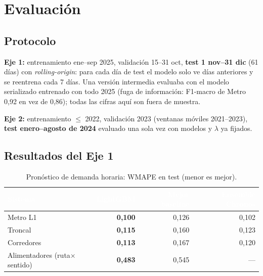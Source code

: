 \documentclass[11pt]{article}
\begin{document}
\section{Evaluación}

\subsection{Protocolo}

\textbf{Eje 1:} entrenamiento ene--sep 2025, validación 15--31 oct, \textbf{test 1 nov--31 dic}
(61 días) con \emph{rolling-origin}: para cada día de test el modelo solo ve días anteriores y se
reentrena cada 7 días. Una versión intermedia evaluaba con el modelo serializado entrenado con todo
2025 (fuga de información: F1-macro de Metro 0,92 en vez de 0,86); todas las cifras aquí son fuera de
muestra.

\textbf{Eje 2:} entrenamiento $\le$ 2022, validación 2023 (ventanas móviles 2021--2023), \textbf{test
enero--agosto de 2024} evaluado una sola vez con modelos y $\lambda$ ya fijados.

\subsection{Resultados del Eje 1}

\begin{table}[H]
\centering\small
\begin{tabular}{@{}lrrr@{}}
\toprule
\rowcolor{tablehead} \textcolor{white}{\bfseries Sistema} & \textcolor{white}{\bfseries LightGBM} & \textcolor{white}{\bfseries Mejor baseline} & \textcolor{white}{\bfseries Ensemble Chronos} \\
\midrule
Metro L1 & \textbf{0,100} & 0,126 & 0,102 \\
\rowcolor{tablerow} Troncal & \textbf{0,115} & 0,160 & 0,123 \\
Corredores & \textbf{0,113} & 0,167 & 0,120 \\
\rowcolor{tablerow} Alimentadores (ruta$\times$sentido) & \textbf{0,483} & 0,545 & --- \\
\bottomrule
\end{tabular}
\caption{Pronóstico de demanda horaria: WMAPE en test (menor es mejor).}
\end{table}
\end{document}

